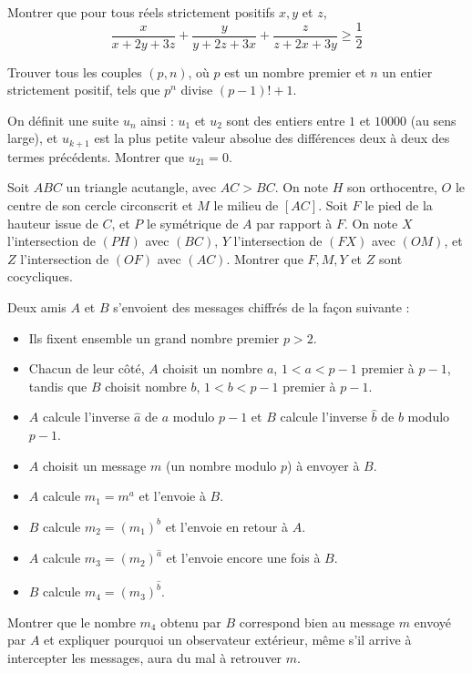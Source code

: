 \begin{exo}{}
Montrer que pour tous réels strictement positifs $x,y$ et $z$,
\[\frac{x}{x+2y+3z}+\frac{y}{y+2z+3x}+\frac{z}{z+2x+3y}\geq \frac{1}{2}\]
\end{exo}

\begin{exo}{}
Trouver tous les couples $(p,n)$, où $p$ est  un nombre premier et $n$ un entier strictement positif, tels que $p^n$ divise $(p-1)! +1$.
\end{exo}

\begin{exo}{}On définit une suite $u_{n}$ ainsi : $u_{1}$ et $u_{2}$ sont des entiers entre $1$ et $10000$ (au sens large), et $u_{k+1}$
est la plus petite valeur absolue des différences deux à deux des termes précédents. Montrer que
$u_{21} = 0$.
\end{exo}

\begin{exo}{}
Soit $ABC$ un triangle acutangle, avec $AC > BC$. On note $H$ son orthocentre, $O$ le centre de son cercle circonscrit et $M$ le milieu de $[AC]$. Soit $F$ le pied de la hauteur issue de $C$, et $P$ le symétrique de $A$ par rapport à $F$. On note $X$ l'intersection de $(PH)$ avec $(BC)$, $Y$ l'intersection de $(FX)$ avec $(OM)$, et $Z$ l'intersection de $(OF)$ avec $(AC)$. Montrer que $F, M, Y$ et $Z$ sont cocycliques.

\end{exo}

\begin{exo}{}
Deux amis $A$ et $B$ s'envoient des messages chiffr\'es de la fa\c con suivante :
{\small 
\begin{itemize}
\item Ils fixent ensemble un grand nombre premier $p>2$.
\item Chacun de leur c\^ot\'e, $A$ choisit un nombre $a$, $1 < a < p-1$ premier \`a $p-1$, tandis que $B$ choisit nombre $b$, $1<b<p-1$ premier \`a $p-1$.
\item $A$ calcule l'inverse $\widehat{a}$ de $a$ modulo $p-1$ et $B$ calcule l'inverse $\widehat{b}$ de $b$ modulo $p-1$.
\item $A$ choisit un message $m$ (un nombre modulo $p$) \`a envoyer \`a $B$.
\item $A$ calcule $m_1=m^{a}$ et l'envoie \`a $B$.
\item $B$ calcule $m_2=(m_1)^{b}$ et l'envoie en retour \`a $A$.
\item $A$ calcule $m_3=(m_2)^{\widehat{a}}$ et l'envoie encore une fois \`a $B$.
\item $B$ calcule $m_4=(m_3)^{\widehat{b}}$.
\end{itemize}}
Montrer que le nombre $m_4$ obtenu par $B$ correspond bien au message $m$ envoy\'e par $A$ et expliquer pourquoi un observateur ext\'erieur, m\^eme s'il arrive \`a intercepter les messages, aura du mal \`a retrouver $m$.
\end{exo}


